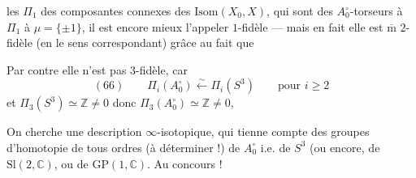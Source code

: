 les $\Pi_1$  des composantes connexes des 
$\mathrm{Isom}(X_0,X)$, qui sont des $A_0^\circ$-torseurs
 à $\Pi_1$  à $\mu=\{\pm1\}$, il est
encore mieux l'appeler $1$-fidèle ---
mais en fait elle est $\overline{\mathrm m}$ $2$-fidèle
(en le sens correspondant) grâce au
fait que

Par contre elle n'est pas $3$-fidèle, car
\[
(66)\qquad \Pi_i(A_0^\circ)\xleftarrow{\sim}\Pi_i(S^3)
\qquad\text{pour }i\geq2
\]
et $\Pi_3(S^3)\simeq\mathbb Z\ne0$ donc $\Pi_3(A_0^\circ)\simeq\mathbb Z\ne0$,

On cherche une description $\infty$-isotopique,
qui tienne compte des groupes d'homotopie
de tous ordres (à déterminer !) de
$A_0^\circ$ i.e. de $S^3$ (ou encore, de $\mathrm{Sl}(2,\mathbb C)$,
ou de $\mathrm{GP}(1,\mathbb C)$. Au concours !

